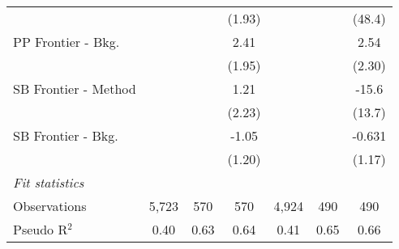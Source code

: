 \begin{tabular}{lcccccc}
                        &              &         & (1.93)      &         &         & (48.4)\\   
   PP Frontier - Bkg.   &              &         & 2.41        &         &         & 2.54\\   
                        &              &         & (1.95)      &         &         & (2.30)\\   
   SB Frontier - Method &              &         & 1.21        &         &         & -15.6\\   
                        &              &         & (2.23)      &         &         & (13.7)\\   
   SB Frontier - Bkg.   &              &         & -1.05       &         &         & -0.631\\   
                        &              &         & (1.20)      &         &         & (1.17)\\   
   \midrule
   \emph{Fit statistics}\\
   Observations         & 5,723        & 570     & 570         & 4,924   & 490     & 490\\  
   Pseudo R$^2$         & 0.40         & 0.63    & 0.64        & 0.41    & 0.65    & 0.66\\  
   

\end{tabular}

